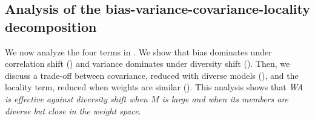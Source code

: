 \subsection{Analysis of the bias-variance-covariance-locality decomposition}%
\label{subsec:analysisbvc}
We now analyze the four terms in .
We show that bias dominates under correlation shift () and variance dominates under diversity shift ().
Then, we discuss a trade-off between covariance, reduced with diverse models (), and the locality term, reduced when weights are similar ().
This analysis shows that \textit{WA is effective against diversity shift when $M$ is large and when its members are diverse but close in the weight space}.




